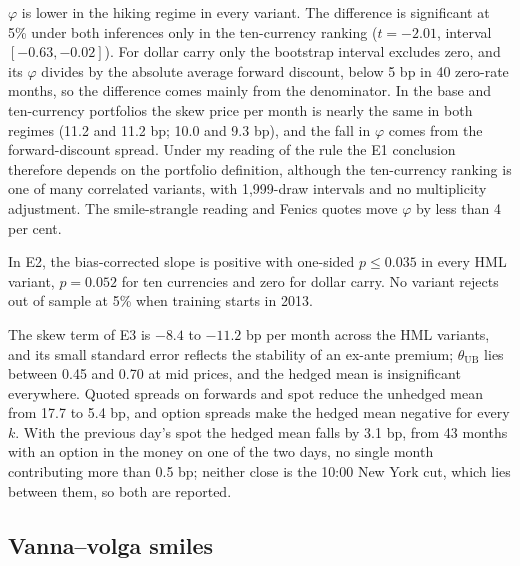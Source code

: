 \documentclass[11pt]{article}
\theoremstyle{result}
\newcommand{\thUB}{\theta_{\mathrm{UB}}}
\begin{document}
$\varphi$ is lower in the hiking regime in every variant. The difference is significant at 5\% under both inferences only in the ten-currency ranking ($t=-2.01$, interval $[-0.63,-0.02]$). For dollar carry only the bootstrap interval excludes zero, and its $\varphi$ divides by the absolute average forward discount, below 5 bp in 40 zero-rate months, so the difference comes mainly from the denominator. In the base and ten-currency portfolios the skew price per month is nearly the same in both regimes (11.2 and 11.2 bp; 10.0 and 9.3 bp), and the fall in $\varphi$ comes from the forward-discount spread. Under my reading of the rule the E1 conclusion therefore depends on the portfolio definition, although the ten-currency ranking is one of many correlated variants, with 1,999-draw intervals and no multiplicity adjustment. The smile-strangle reading and Fenics quotes move $\varphi$ by less than 4 per cent.

In E2, the bias-corrected slope is positive with one-sided $p\le0.035$ in every HML variant, $p=0.052$ for ten currencies and zero for dollar carry. No variant rejects out of sample at 5\% when training starts in 2013.

The skew term of E3 is $-8.4$ to $-11.2$ bp per month across the HML variants, and its small standard error reflects the stability of an ex-ante premium; $\thUB$ lies between 0.45 and 0.70 at mid prices, and the hedged mean is insignificant everywhere. Quoted spreads on forwards and spot reduce the unhedged mean from 17.7 to 5.4 bp, and option spreads make the hedged mean negative for every $k$. With the previous day's spot the hedged mean falls by 3.1 bp, from 43 months with an option in the money on one of the two days, no single month contributing more than 0.5 bp; neither close is the 10:00 New York cut, which lies between them, so both are reported.

\subsection{Vanna--volga smiles}
\end{document}
